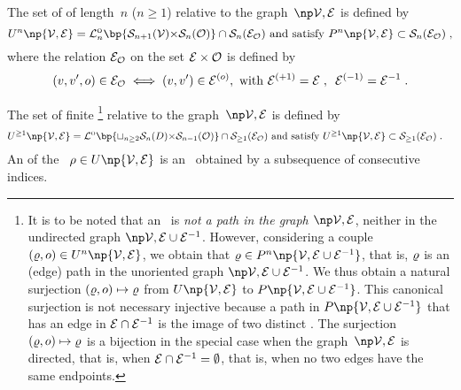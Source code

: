 \documentclass[12pt]{article}
\begin{document}
{{{The set of \emph{\undirectedEdgePath} of length~$n$ ($n\ge 1$) relative to the
graph~$\npOrientedGraph$ is defined by
\begin{equation}
  \UPATH^n\np{\OrientedGraph} =
  \Lifto_n \bp{ \Sequence_{n+1}(\VERTEX){\times}\Sequence_{n}(\Orientation)}
  \cap \Sequence_{n}(\EDGEo)
  \text{ and satisfy } \PATH^n\np{\OrientedGraph} \subset \Sequence_{n}(\EDGEo)
  \eqfinv
\end{equation}
where the relation ${{\cal E}}_{\cal O}$ on the set ${\cal E}\times{\cal O}$ is defined by 
\begin{align}
  (v,v',o) \in {{\cal E}}_{\cal O}
  \iff (v, v') \in {\cal E}^{(o)},
  \text{ with } {\cal E}^{(+1)}= {\cal E} \; , \enspace {\cal E}^{(-1)}= {\cal E}^{-1}
  \; .
  \label{def:Eo_relation}
\end{align}

The set of finite \undirectedEdgePaths\footnote{%
  It is to be noted that an \undirectedEdgePath\ is \emph{not a path in the graph
    $\npOrientedGraph$}, neither in the undirected graph $\npUnorientedGraph$.
  However, considering a couple $(\path,\orient)\in \UPATH^n\np{\OrientedGraph}$, we obtain that
  $\path \in \PATH^n\np{\UnorientedGraph}$,
  that is, $\varrho$ is an (edge) path in the unoriented graph
  \( \npUnorientedGraph \).
  We thus obtain a natural surjection
  $(\varrho,o)\mapsto \varrho$
    from $\UPATH\np{\OrientedGraph}$ to $\PATH\np{\UnorientedGraph}$.
    This canonical surjection is not necessary injective because
    a path in $\PATH\np{\UnorientedGraph}$ that has an edge in ${\cal E} \cap {\cal E}^{-1}$
    is the image of two distinct \undirectedEdgePaths.
    The surjection $(\varrho,o)\mapsto \varrho$ 
    is a bijection in the special case when 
    the graph~\( \npOrientedGraph \) is directed,
    that is, when ${\cal E} \cap {\cal E}^{-1}=\emptyset$, that is, 
    when no two edges have the same endpoints. 
  }
  relative to the graph~$\npOrientedGraph$ 
  is defined by
\begin{align}
  \UPATH^{\ge 1}\np{\OrientedGraph}
  &=
    \Lifto \bp{\sqcup_{n\ge 2} \Sequence_{n}(\Set){\times}\Sequence_{n-1}(\Orientation)}
    \cap \Sequence_{\ge 1}(\EDGEo)
    \text{ and satisfy } \UPATH^{\ge 1}\np{\OrientedGraph}  \subset \Sequence_{\ge 1}(\EDGEo) 
    \eqfinp
    \label{def:eopaths_gt1}
\end{align}
An \emph{\undirectedEdgeSubPath} of the \undirectedEdgePath~$\UndirectedPath
\in\UPATH\np{\OrientedGraph}$ is an \undirectedEdgePath\ obtained by a
subsequence of consecutive indices. 

}}}
\end{document}
